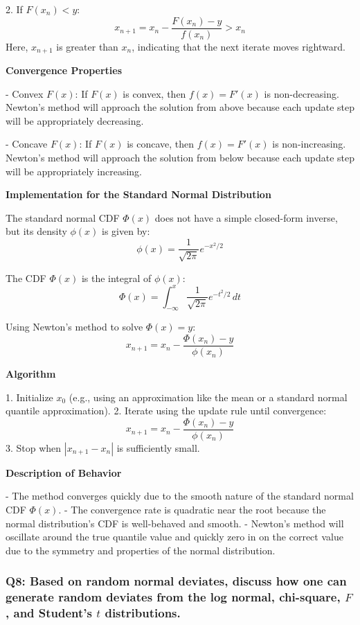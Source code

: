 \documentclass[8pt]{article}
\begin{document}
2. If \( F(x_n) < y \):
   \[
   x_{n+1} = x_n - \frac{F(x_n) - y}{f(x_n)} > x_n
   \]
   Here, \( x_{n+1} \) is greater than \( x_n \), indicating that the next iterate moves rightward.

\textbf{Convergence Properties}

- Convex \( F(x) \): If \( F(x) \) is convex, then \( f(x) = F'(x) \) is non-decreasing. Newton's method will approach the solution from above because each update step will be appropriately decreasing.

- Concave \( F(x) \): If \( F(x) \) is concave, then \( f(x) = F'(x) \) is non-increasing. Newton's method will approach the solution from below because each update step will be appropriately increasing.

\textbf{Implementation for the Standard Normal Distribution}

The standard normal CDF \( \Phi(x) \) does not have a simple closed-form inverse, but its density \( \phi(x) \) is given by:
\[
\phi(x) = \frac{1}{\sqrt{2\pi}} e^{-x^2/2}
\]

The CDF \( \Phi(x) \) is the integral of \( \phi(x) \):
\[
\Phi(x) = \int_{-\infty}^x \frac{1}{\sqrt{2\pi}} e^{-t^2/2} \, dt
\]

Using Newton's method to solve \( \Phi(x) = y \):
\[
x_{n+1} = x_n - \frac{\Phi(x_n) - y}{\phi(x_n)}
\]

\textbf{Algorithm}

1. Initialize \( x_0 \) (e.g., using an approximation like the mean or a standard normal quantile approximation).
2. Iterate using the update rule until convergence:
   \[
   x_{n+1} = x_n - \frac{\Phi(x_n) - y}{\phi(x_n)}
   \]
3. Stop when \( |x_{n+1} - x_n| \) is sufficiently small.

\textbf{Description of Behavior}

- The method converges quickly due to the smooth nature of the standard normal CDF \( \Phi(x) \).
- The convergence rate is quadratic near the root because the normal distribution's CDF is well-behaved and smooth.
- Newton's method will oscillate around the true quantile value and quickly zero in on the correct value due to the symmetry and properties of the normal distribution.


\subsubsection*{Q8:
Based on random normal deviates, discuss how one can generate random deviates from the log normal, chi-square, \(F\), and Student’s \(t\) distributions.}
\end{document}
